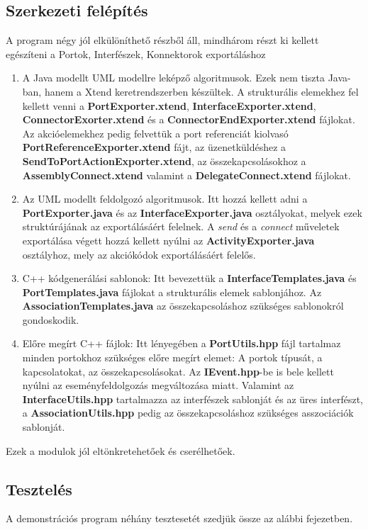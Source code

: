 \documentclass[a4paper,12pt]{report}
\begin{document}
\subsection{Szerkezeti felépítés}
A program négy jól elkülöníthető részből áll, mindhárom részt ki kellett egészíteni a Portok, Interfészek, Konnektorok exportáláshoz

\begin{enumerate}
\item A Java modellt UML modellre leképző algoritmusok. Ezek nem tiszta Java-ban, hanem a Xtend keretrendszerben készültek. A strukturális elemekhez fel kellett venni a \textbf{PortExporter.xtend}, \textbf{InterfaceExporter.xtend}, \textbf{ConnectorExorter.xtend} és a \textbf{ConnectorEndExporter.xtend} fájlokat. Az akcióelemekhez pedig felvettük a port referenciát kiolvasó \textbf{PortReferenceExporter.xtend} fájt, az üzenetküldéshez a \textbf{SendToPortActionExporter.xtend}, az összekapcsolásokhoz a \textbf{AssemblyConnect.xtend} valamint a \textbf{DelegateConnect.xtend} fájlokat.
\item Az UML modellt feldolgozó algoritmusok. Itt hozzá kellett adni a  \textbf{PortExporter.java} és az \textbf{InterfaceExporter.java} osztályokat, melyek ezek struktúrájának az exportálásáért felelnek. A \textit{send} és a \textit{connect} műveletek exportálása végett hozzá kellett nyúlni az \textbf{ActivityExporter.java} osztályhoz, mely az akciókódok exportálásáért felelős.
\item C++ kódgenerálási sablonok: Itt bevezettük a \textbf{InterfaceTemplates.java} és \textbf{PortTemplates.java} fájlokat a strukturális elemek sablonjához. Az \textbf{AssociationTemplates.java} az összekapcsoláshoz szükséges sablonokról gondoskodik.
\item Előre megírt C++ fájlok: Itt lényegében a \textbf{PortUtils.hpp} fájl tartalmaz minden portokhoz szükséges előre megírt elemet: A portok típusát, a kapcsolatokat, az összekapcsolásokat. Az \textbf{IEvent.hpp}-be is bele kellett nyúlni az eseményfeldolgozás megváltozása miatt. Valamint az \textbf{InterfaceUtils.hpp} tartalmazza az interfészek sablonját és az üres interfészt, a \textbf{AssociationUtils.hpp} pedig az összekapcsoláshoz szükséges asszociációk sablonját.
\end{enumerate}

Ezek a modulok jól eltönkretehetőek és cserélhetőek. 

\subsection{Tesztelés}
A demonstrációs program néhány tesztesetét szedjük össze az alábbi fejezetben.
\end{document}
